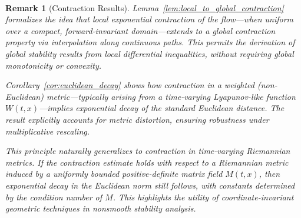 \documentclass[11pt]{article}
\newtheorem{remark}{Remark}
\begin{document}
\

\begin{remark}[Contraction Results]\label{rem:contraction_results}
Lemma~\ref{lem:local_to_global_contraction} formalizes the idea that local exponential contraction of the flow—when uniform over a compact, forward-invariant domain—extends to a global contraction property via interpolation along continuous paths. This permits the derivation of global stability results from local differential inequalities, without requiring global monotonicity or convexity.
	
Corollary~\ref{cor:euclidean_decay} shows how contraction in a weighted (non-Euclidean) metric—typically arising from a time-varying Lyapunov-like function \( W(t,x) \)—implies exponential decay of the standard Euclidean distance. The result explicitly accounts for metric distortion, ensuring robustness under multiplicative rescaling.
	
This principle naturally generalizes to contraction in time-varying Riemannian metrics. If the contraction estimate holds with respect to a Riemannian metric induced by a uniformly bounded positive-definite matrix field \( M(t,x) \), then exponential decay in the Euclidean norm still follows, with constants determined by the condition number of \( M \). This highlights the utility of coordinate-invariant geometric techniques in nonsmooth stability analysis.
\end{remark}
\end{document}
